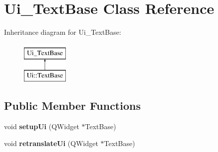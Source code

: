 \hypertarget{class_ui___text_base}{}\section{Ui\+\_\+\+Text\+Base Class Reference}
\label{class_ui___text_base}
Inheritance diagram for Ui\+\_\+\+Text\+Base\+:\begin{figure}[H]
\begin{center}
\leavevmode
\includegraphics[height=2.000000cm]{class_ui___text_base}
\end{center}
\end{figure}
\subsection*{Public Member Functions}
\begin{DoxyCompactItemize}
\item 
\mbox{\label{class_ui___text_base_a389e2e3f5bbaed7911aad836683691a1}} 
void {\bfseries setup\+Ui} (Q\+Widget $\ast$Text\+Base)
\item 
\mbox{\label{class_ui___text_base_ae4a121da614ff4d2bd1ea7893b6b290f}} 
void {\bfseries retranslate\+Ui} (Q\+Widget $\ast$Text\+Base)
\end{DoxyCompactItemize}
